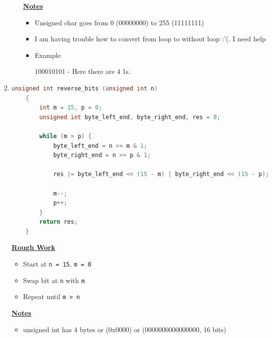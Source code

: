 \documentclass[12pt]{article}
\begin{document}
\begin{enumerate}[1.]
\begin{enumerate}[a)]
        \bigskip

        \underline{\textbf{Notes}}

        \begin{itemize}
            \item Unsigned char goes from 0 (00000000) to 255 (11111111)
            \item I am having trouble how to convert from loop to without loop :'(.
            I need help
            \item Example

            \bigskip

            100010101 - Here there are 4 1s.

            \bigskip
        \end{itemize}

    \end{enumerate}

    \item

\begin{lstlisting}[language=c]
    unsigned int reverse_bits (unsigned int n)
    {
        int m = 15, p = 0;
        unsigned int byte_left_end, byte_right_end, res = 0;

        while (m > p) {
            byte_left_end = n >> m & 1;
            byte_right_end = n >> p & 1;

            res |= byte_left_end << (15 - m) | byte_right_end << (15 - p);

            m--;
            p++;
        }
        return res;
    }
\end{lstlisting}

    \bigskip

    \underline{\textbf{Rough Work}}

    \begin{itemize}
        \item Start at \texttt{n = 15}, \texttt{m = 0}
        \item Swap bit at \texttt{n} with \texttt{m}
        \item Repeat until \texttt{m > n}
    \end{itemize}

    \bigskip

    \underline{\textbf{Notes}}

    \begin{itemize}
        \item unsigned int has 4 bytes or (0x0000) or (0000000000000000, 16 bits)
    \end{itemize}


\end{enumerate}
\end{document}
